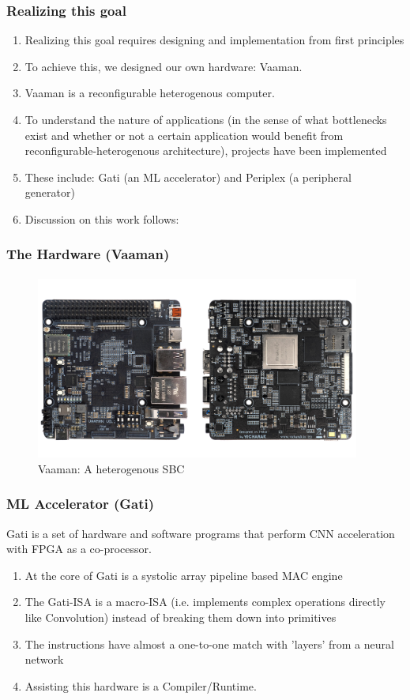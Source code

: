 \documentclass{beamer}
\begin{document}
\begin{frame}[fragile]
  \frametitle{Realizing this goal}
  \begin{enumerate}
    \item Realizing this goal requires designing and implementation from
      first principles
    \item To achieve this, we designed our own hardware: Vaaman. 
    \item Vaaman is a reconfigurable heterogenous computer.
    \item To understand the nature of applications (in the sense of what
      bottlenecks exist and whether or not a certain application would
      benefit from reconfigurable-heterogenous architecture), projects have been implemented
    \item These include: Gati (an ML accelerator) and Periplex (a peripheral
      generator)
    \item Discussion on this work follows:
  \end{enumerate}
  \framesubtitle{}
\end{frame}

\begin{frame}[fragile]
  \frametitle{The Hardware (Vaaman)}
  \framesubtitle{}
  \begin{figure}
    \centering
    \includegraphics[width=0.95\textwidth]{vaaman.jpg}
    \caption{Vaaman: A heterogenous SBC}
    \label{neuron}
  \end{figure}
\end{frame}

\begin{frame}[fragile]
  \frametitle{ML Accelerator (Gati)}
  Gati is a set of hardware and software programs that perform CNN
  acceleration with FPGA as a co-processor.
  \begin{enumerate}
    \item At the core of Gati is a systolic array pipeline based MAC engine
    \item The Gati-ISA is a macro-ISA (i.e. implements complex operations directly
      like Convolution) instead of breaking them down into primitives
    \item The instructions have almost a one-to-one match with 'layers'
      from a neural network
    \item Assisting this hardware is a Compiler/Runtime.
  \end{enumerate}
\end{frame}
\end{document}
